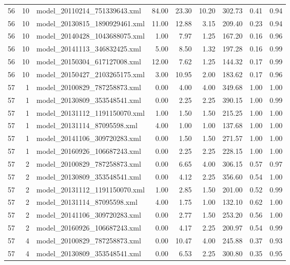 \begin{table}[ht]
\begin{tabular}{rrlrrrrrr}
   56 &  10 & model\_20110214\_751339643.xml & 84.00 & 23.30 & 10.20 & 302.73 & 0.41 & 0.94 \\ 
   56 &  10 & model\_20130815\_1890929461.xml & 11.00 & 12.88 & 3.15 & 209.40 & 0.23 & 0.94 \\ 
   56 &  10 & model\_20140428\_1043688075.xml & 1.00 & 7.97 & 1.25 & 167.20 & 0.16 & 0.96 \\ 
   56 &  10 & model\_20141113\_346832425.xml & 5.00 & 8.50 & 1.32 & 197.28 & 0.16 & 0.99 \\ 
   56 &  10 & model\_20150304\_617127008.xml & 12.00 & 7.62 & 1.25 & 144.32 & 0.17 & 0.99 \\ 
   56 &  10 & model\_20150427\_2103265175.xml & 3.00 & 10.95 & 2.00 & 183.62 & 0.17 & 0.96 \\ 
   57 &   1 & model\_20100829\_787258873.xml & 0.00 & 4.00 & 4.00 & 349.68 & 1.00 & 1.00 \\ 
   57 &   1 & model\_20130809\_353548541.xml & 0.00 & 2.25 & 2.25 & 390.15 & 1.00 & 0.99 \\ 
   57 &   1 & model\_20131112\_1191150070.xml & 1.00 & 1.50 & 1.50 & 215.25 & 1.00 & 1.00 \\ 
   57 &   1 & model\_20131114\_87095598.xml & 4.00 & 1.00 & 1.00 & 137.68 & 1.00 & 1.00 \\ 
   57 &   1 & model\_20141106\_309720283.xml & 0.00 & 1.50 & 1.50 & 271.57 & 1.00 & 1.00 \\ 
   57 &   1 & model\_20160926\_106687243.xml & 0.00 & 2.25 & 2.25 & 228.15 & 1.00 & 1.00 \\ 
   57 &   2 & model\_20100829\_787258873.xml & 0.00 & 6.65 & 4.00 & 306.15 & 0.57 & 0.97 \\ 
   57 &   2 & model\_20130809\_353548541.xml & 0.00 & 4.12 & 2.25 & 356.60 & 0.54 & 1.00 \\ 
   57 &   2 & model\_20131112\_1191150070.xml & 1.00 & 2.85 & 1.50 & 201.00 & 0.52 & 0.99 \\ 
   57 &   2 & model\_20131114\_87095598.xml & 4.00 & 1.75 & 1.00 & 132.10 & 0.62 & 1.00 \\ 
   57 &   2 & model\_20141106\_309720283.xml & 0.00 & 2.77 & 1.50 & 253.20 & 0.56 & 1.00 \\ 
   57 &   2 & model\_20160926\_106687243.xml & 0.00 & 4.17 & 2.25 & 200.97 & 0.54 & 0.99 \\ 
   57 &   4 & model\_20100829\_787258873.xml & 0.00 & 10.47 & 4.00 & 245.88 & 0.37 & 0.93 \\ 
   57 &   4 & model\_20130809\_353548541.xml & 0.00 & 6.53 & 2.25 & 300.80 & 0.35 & 0.95 \\ 

\end{tabular}
\end{table}
